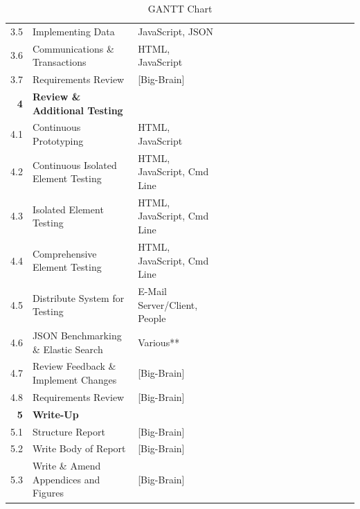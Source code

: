 \documentclass[11pt, english]{article}
\begin{document}
\begin{landscape}
\begin{table}[h]
\begin{center}
\begin{tabular}{rll|cccccccccccccc}
		3.5 & Implementing Data & JavaScript, JSON & & & & \cellcolor{gray} & \cellcolor{gray} & \cellcolor{gray} & \cellcolor{gray} & \cellcolor{gray} & \cellcolor{gray}\\
		3.6 & Communications \& Transactions & HTML, JavaScript & & & & \cellcolor{gray} & \cellcolor{gray} & \cellcolor{gray} & \cellcolor{gray} & \cellcolor{gray} & \cellcolor{gray}\\
		3.7 & Requirements Review & [Big-Brain] & & & & & & & & & \cellcolor{gray}\\
                \hline
		\textbf{4} & \textbf{Review \& Additional Testing} &\\
		4.1 & Continuous Prototyping & HTML, JavaScript & & & & \cellcolor{gray} & \cellcolor{gray} & \cellcolor{gray} & \cellcolor{gray} & \cellcolor{gray} & \cellcolor{gray}\\
		4.2 & Continuous Isolated Element Testing & HTML, JavaScript, Cmd Line & & & & \cellcolor{gray} & \cellcolor{gray} & \cellcolor{gray} & \cellcolor{gray} & \cellcolor{gray} & \cellcolor{gray}\\
		4.3 & Isolated Element Testing & HTML, JavaScript, Cmd Line & & & & & & & & & \cellcolor{gray}\\
		4.4 & Comprehensive Element Testing & HTML, JavaScript, Cmd Line & & & & & & & & & \cellcolor{gray}\\
		4.5 & Distribute System for Testing & E-Mail Server/Client, People & & & & & & & & & \cellcolor{gray}\\
		4.6 & JSON Benchmarking \& Elastic Search & Various** & & & & & & & & & \cellcolor{gray}\\
		4.7 & Review Feedback \& Implement Changes & [Big-Brain] & & & & & & & & & \cellcolor{gray} & \cellcolor{gray}\\
		4.8 & Requirements Review & [Big-Brain] & & & & & & & & & & \cellcolor{gray}\\
                \hline
		\textbf{5} & \textbf{Write-Up} &\\
		5.1 & Structure Report & [Big-Brain] & & & & & & & & \cellcolor{gray} & \cellcolor{gray} & \cellcolor{gray}\\
		5.2 & Write Body of Report & [Big-Brain] & & & & & & & & & & \cellcolor{gray} & \cellcolor{gray} & \cellcolor{gray} & \cellcolor{gray}\\
		5.3 & Write \& Amend Appendices and Figures & [Big-Brain] & & & & & & & & \cellcolor{gray} & \cellcolor{gray} & \cellcolor{gray} & \cellcolor{gray} & \cellcolor{gray} & \cellcolor{gray}\\
                \hline
        \end{tabular}
                \caption{GANTT Chart}
        \end{center}
        \end{table}

\end{landscape}
\end{document}
